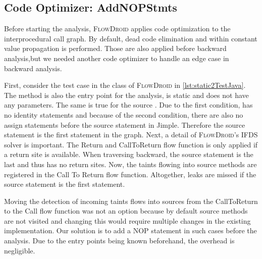 \documentclass[../draft.tex]{subfiles}
\begin{document}
    \subsection{Code Optimizer: AddNOPStmts}
    Before starting the analysis, \textsc{FlowDroid} applies code optimization to the interprocedural call graph. 
    By default, dead code elimination and within constant value propagation is performed. 
    Those are also applied before backward analysis,but we needed another code optimizer to handle an edge case in backward analysis.

    First, consider the  test case in the  class of \textsc{FlowDroid} in \autoref{lst:static2TestJava}. 
    The method is also the entry point for the analysis, is static and does not have any parameters. 
    The same is true for the source . 
    Due to the first condition,  has no identity statements and because of the second condition, there are also no assign statements before the source statement in Jimple. 
    Therefore the source statement is the first statement in the graph. 
    Next, a detail of \textsc{FlowDroid}'s IFDS solver is important. 
    The Return and CallToReturn flow function is only applied if a return site is available.
    When traversing backward, the source statement is the last and thus has no return sites. 
    Now, the taints flowing into source methods are registered in the Call To Return flow function. 
    Altogether, leaks are missed if the source statement is the first statement.

    Moving the detection of incoming taints flows into sources from the CallToReturn to the Call flow function was not an option because by default source methods are not visited and changing this would require multiple changes in the existing implementation. 
    Our solution is to add a NOP statement in such cases before the analysis. 
    Due to the entry points being known beforehand, the overhead is negligible.
\end{document}
